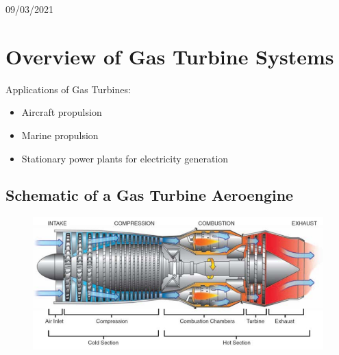 \documentclass[class=report, crop=false, 12pt,a4paper]{standalone}
\numberwithin{equation}{section}
\begin{document}
\begin{center}
  09/03/2021
\end{center}
\section{Overview of Gas Turbine Systems}
Applications of Gas Turbines:
\begin{itemize}[noitemsep]
  \item Aircraft propulsion
  \item Marine propulsion
  \item Stationary power plants for electricity generation
\end{itemize}
\subsection{Schematic of a Gas Turbine Aeroengine}
\begin{figure}[H]
  \centering
  \includegraphics[width = 1 \textwidth]{../img/diagram151.png}
  \caption{}
\end{figure}
\end{document}
